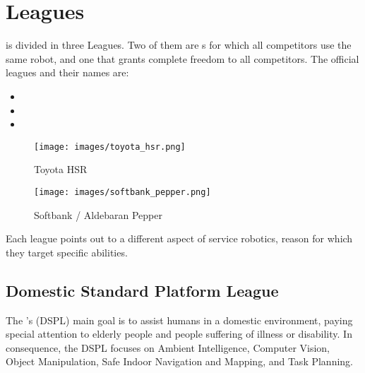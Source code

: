 \section{Leagues}
\label{sec:leagues}

 is divided in three Leagues. Two of them are s for which all competitors use the same robot, and one that grants complete freedom to all competitors. The official leagues and their names are:
\begin{itemize}
  \item  {}
  \item  {}
  \item  {}
\end{itemize}

\begin{wrapfigure}[21]{r}{0.30\textwidth}
	\vspace{-30pt}
	\begin{center}
		\texttt{[image: images/toyota\_hsr.png]}
		\vspace{-10pt}
		\caption{Toyota HSR}
		\label{fig:toyotaHSR}
	\end{center}

	\vspace{-25pt}
	\begin{center}
		\texttt{[image: images/softbank\_pepper.png]}
		\vspace{-10pt}
		\caption{Softbank / Aldebaran Pepper}
		\label{fig:softbank-pepper}
	\end{center}
\end{wrapfigure}
Each league points out to a different aspect of service robotics, reason for which they target specific abilities.


\subsection{Domestic Standard Platform League}
The 's (DSPL) main goal is to assist humans in a domestic environment, paying special attention to elderly people and people suffering of illness or disability. In consequence, the DSPL focuses on Ambient Intelligence, Computer Vision, Object Manipulation, Safe Indoor Navigation and Mapping, and Task Planning.

